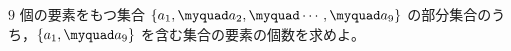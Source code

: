 $9$ 個の要素をもつ集合 $\{a_1,\myquad a_2,\myquad \cdots ,\myquad a_9\}$ の部分集合のうち，$\{a_1,\myquad a_9\}$ を含む集合の要素の個数を求めよ。
